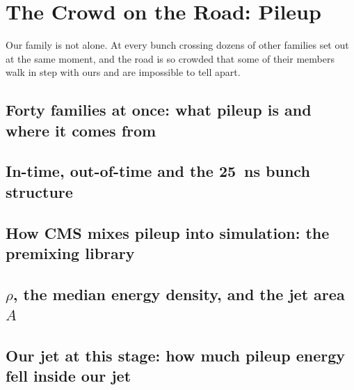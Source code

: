 \chapter{The Crowd on the Road: Pileup}
\label{ch:crowd_on_the_road}

\begin{journeybox}
Our family is not alone. At every bunch crossing dozens of other families set
out at the same moment, and the road is so crowded that some of their members
walk in step with ours and are impossible to tell apart.
\end{journeybox}


\section{Forty families at once: what pileup is and where it comes from}
\label{sec:crowd_on_the_road:forty_families_at_once_what_pileup_is_an}

\section{In-time, out-of-time and the 25~ns bunch structure}
\label{sec:crowd_on_the_road:in_time_out_of_time_and_the_25_ns_bunch_}

\section{How CMS mixes pileup into simulation: the premixing library}
\label{sec:crowd_on_the_road:how_cms_mixes_pileup_into_simulation_the}

\section{$\rho$, the median energy density, and the jet area $A$}
\label{sec:crowd_on_the_road:rho_the_median_energy_density_and_the_je}

\section{Our jet at this stage: how much pileup energy fell inside our jet}
\label{sec:crowd_on_the_road:our_jet_at_this_stage_how_much_pileup_en}

